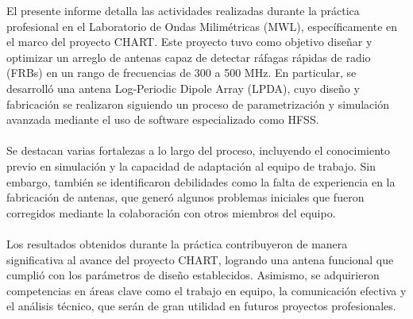 \documentclass[
	spanish, %
	letterpaper, oneside
]{article}
\begin{document}
\templatePortrait

\templatePagecfg

\begin{abstractd}

El presente informe detalla las actividades realizadas durante la práctica profesional en el Laboratorio de Ondas Milimétricas (MWL), específicamente en el marco del proyecto CHART. Este proyecto tuvo como objetivo diseñar y optimizar un arreglo de antenas capaz de detectar ráfagas rápidas de radio (FRBs) en un rango de frecuencias de 300 a 500 MHz. En particular, se desarrolló una antena Log-Periodic Dipole Array (LPDA), cuyo diseño y fabricación se realizaron siguiendo un proceso de parametrización y simulación avanzada mediante el uso de software especializado como HFSS.\\\\
Se destacan varias fortalezas a lo largo del proceso, incluyendo el conocimiento previo en simulación y la capacidad de adaptación al equipo de trabajo. Sin embargo, también se identificaron debilidades como la falta de experiencia en la fabricación de antenas, que generó algunos problemas iniciales que fueron corregidos mediante la colaboración con otros miembros del equipo.\\\\
Los resultados obtenidos durante la práctica contribuyeron de manera significativa al avance del proyecto CHART, logrando una antena funcional que cumplió con los parámetros de diseño establecidos. Asimismo, se adquirieron competencias en áreas clave como el trabajo en equipo, la comunicación efectiva y el análisis técnico, que serán de gran utilidad en futuros proyectos profesionales.

\end{abstractd}

\templateIndex

\templateFinalcfg



\end{document}

